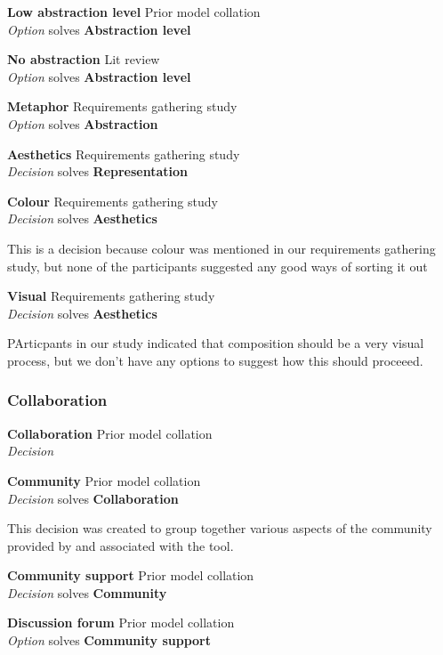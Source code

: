 \textbf{Low abstraction level} \hfill Prior model collation \cite{Grammel2010} \\ \emph{Option} \hfill solves \textbf{Abstraction level}

\textbf{No abstraction} \hfill Lit review \cite{Nestler2010} \\ \emph{Option} \hfill solves \textbf{Abstraction level}

\textbf{Metaphor} \hfill Requirements gathering study \\ \emph{Option} \hfill solves \textbf{Abstraction}
 
\textbf{Aesthetics} \hfill Requirements gathering study \\ \emph{Decision} \hfill solves \textbf{Representation}

\textbf{Colour} \hfill Requirements gathering study \\ \emph{Decision} \hfill solves \textbf{Aesthetics}

This is a decision because colour was mentioned in our requirements gathering study, but none of the participants suggested any good ways of sorting it out

\textbf{Visual} \hfill Requirements gathering study \\ \emph{Decision} \hfill solves \textbf{Aesthetics}

PArticpants in our study indicated that composition should be a very visual process, but we don't have any options to suggest how this should proceeed.

\subsubsection{Collaboration}

\textbf{Collaboration} \hfill Prior model collation \cite{Aghaee2012} \\ \emph{Decision} \hfill 

\textbf{Community} \hfill Prior model collation \\ \emph{Decision} \hfill solves \textbf{Collaboration}

This decision was created to group together various aspects of the community provided by and associated with the tool.

\textbf{Community support} \hfill Prior model collation \cite{Aghaee2012} \\ \emph{Decision} \hfill solves \textbf{Community}

\textbf{Discussion forum} \hfill Prior model collation \cite{Grammel2010} \\ \emph{Option} \hfill solves \textbf{Community support}


